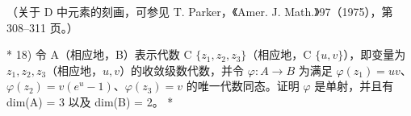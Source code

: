 （关于 D 中元素的刻画，可参见 T. Parker，《Amer. J. Math.》97（1975），第 308–311 页。）

* 18) 令 A（相应地，B）表示代数 C \(\{z_{1}, z_{2}, z_{3}\}\)（相应地，C \(\{u, v\}\)），即变量为 \(z_{1}, z_{2}, z_{3}\)（相应地，\(u, v\)）的收敛级数代数，并令 \(\varphi: A \to B\) 为满足 \(\varphi(z_{1}) = uv\)、\(\varphi(z_{2}) = v(e^{u} - 1)\)、\(\varphi(z_{3}) = v\) 的唯一代数同态。证明 \(\varphi\) 是单射，并且有 dim(A) = 3 以及 dim(B) = 2。 *

